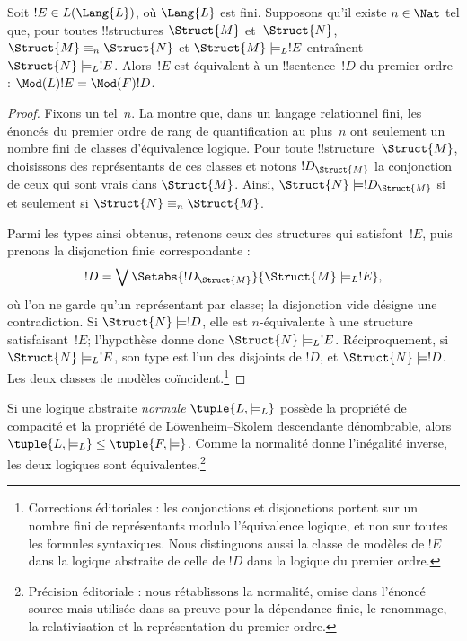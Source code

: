 \documentclass[../../../include/open-logic-section]{subfiles}
\begin{document}


\begin{lem}
Soit $!E\in L(\Lang{L})$, où
$\Lang{L}$ est fini. Supposons
qu'il existe $n\in\Nat$ tel que,
pour toutes !!{structure}s
$\Struct{M}$ et~$\Struct{N}$,
$\Struct{M}\equiv_n\Struct{N}$
et $\Struct{M}\models_L !E$
entraînent
$\Struct{N}\models_L !E$.
Alors~$!E$ est équivalent à un
!!{sentence}~$!D$ du premier ordre :
$\Mod(L){!E}=\Mod(F){!D}$.
\end{lem}

\begin{proof}
Fixons un tel~$n$. La
montre que, dans un langage
relationnel fini, les énoncés
du premier ordre de rang de
quantification au plus~$n$
ont seulement un nombre fini
de classes d'équivalence logique.
Pour toute !!{structure}~$\Struct{M}$,
choisissons des représentants de
ces classes et notons
$!D_{\Struct{M}}$ la conjonction
de ceux qui sont vrais dans
$\Struct{M}$. Ainsi,
$\Struct{N}\models !D_{\Struct{M}}$
si et seulement si
$\Struct{N}\equiv_n\Struct{M}$.

Parmi les types ainsi obtenus,
retenons ceux des structures qui
satisfont~$!E$, puis prenons la
disjonction finie correspondante :
\[
!D=\bigvee
  \Setabs{!D_{\Struct{M}}}{
    \Struct{M}\models_L !E},
\]
où l'on ne garde qu'un représentant
par classe; la disjonction vide
désigne une contradiction. Si
$\Struct{N}\models !D$, elle
est $n$-équivalente à une
structure satisfaisant~$!E$;
l'hypothèse donne donc
$\Struct{N}\models_L !E$.
Réciproquement, si
$\Struct{N}\models_L !E$, son
type est l'un des disjoints de
$!D$, et $\Struct{N}\models !D$.
Les deux classes de modèles
coïncident.\footnote{Corrections éditoriales : les conjonctions et disjonctions portent sur un nombre fini de représentants modulo l'équivalence logique, et non sur toutes les formules syntaxiques. Nous distinguons aussi la classe de modèles de $!E$ dans la logique abstraite de celle de $!D$ dans la logique du premier ordre.}
\end{proof}

\begin{thm}
Si une logique abstraite
\emph{normale} $\tuple{L,\models_L}$
possède la propriété de compacité
et la propriété de Löwenheim--Skolem
descendante dénombrable, alors
$\tuple{L,\models_L}\leq
\tuple{F,\models}$. Comme la
normalité donne l'inégalité
inverse, les deux logiques
sont équivalentes.\footnote{Précision éditoriale : nous rétablissons la normalité, omise dans l'énoncé source mais utilisée dans sa preuve pour la dépendance finie, le renommage, la relativisation et la représentation du premier ordre.}
\end{thm}
\end{document}
